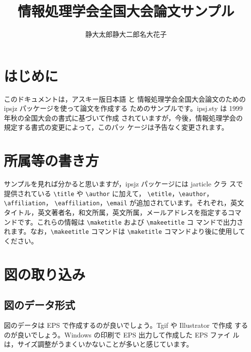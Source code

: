 \documentclass[a4j,10pt,twocolumn]{jarticle}
\title{情報処理学会全国大会論文サンプル}
\author{静大太郎\DAG \quad 静大二郎\DAG \quad 名大花子\DDAG}
\affiliation{\DAG 静岡大学情報学部 \quad\quad \DDAG 名古屋大学工学部}
\begin{document}
\maketitle              %
\makeetitle             %

\section{はじめに}

このドキュメントは，アスキー版日本語 \LaTeXe\cite{texdoc}\cite{ascii}と
情報処理学会全国大会論文のためのipsjz パッケージを使って論文を作成する
ためのサンプルです。ipsj.sty は 1999 年秋の全国大会の書式に基づいて作成
されていますが，今後，情報処理学会の規定する書式の変更によって，このパッ
ケージは予告なく変更されます。

\section{所属等の書き方}

サンプルを見れば分かると思いますが，ipsjz パッケージには jarticle クラ
スで提供されている \verb+\title+ や \verb+\author+ に加えて，
\verb+\etitle+，\verb+\eauthor+，\verb+\affiliation+，
\verb+\eaffiliation+，\verb+\email+ が追加されています。それぞれ，英文
タイトル，英文著者名，和文所属，英文所属，メールアドレスを指定するコマ
ンドです。これらの情報は \verb+\maketitle+ および \verb+\makeetitle+ コ
マンドで出力されます。なお，\verb+\makeetitle+ コマンドは 
\verb+\maketitle+ コマンドより後に使用してください。

\section{図の取り込み}

\subsection{図のデータ形式}

図のデータは EPS で作成するのが良いでしょう。Tgif や Illustrator で作成
するのが良いでしょう。Windows の印刷で EPS 出力して作成した EPS ファイ
ルは，サイズ調整がうまくいかないことが多いと感じています。
\end{document}
